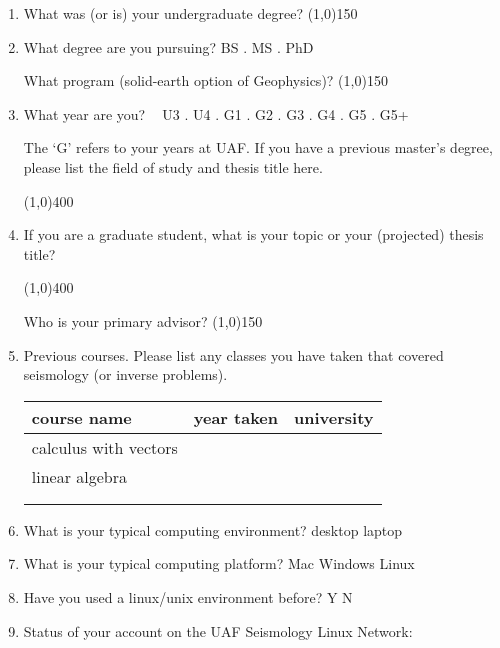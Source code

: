 \documentclass[11pt,titlepage,fleqn]{article}
\begin{document}
\begin{enumerate}
\item What was (or is) your undergraduate degree? \line(1,0){150}

\item What degree are you pursuing? BS . MS . PhD

\noindent
What program (\eg solid-earth option of Geophysics)? \line(1,0){150}

\item What year are you? $\;\;$ U3 . U4 . G1 . G2 . G3 . G4 . G5 . G5+

The `G' refers to your years at UAF. If you have a previous master's degree, please list the field of study and thesis title here.

\noindent \line(1,0){400}

\item If you are a graduate student, what is your topic or your (projected) thesis title?

\noindent \line(1,0){400}

\noindent Who is your primary advisor? \noindent \line(1,0){150}

\item Previous courses. Please list any classes you have taken that covered
seismology (or inverse problems).

\begin{tabular}{l|l|l}
\hline
course name & year taken & university \\ \hline\hline
calculus with vectors & & \hspace{3cm} \\ \hline
linear algebra & & \\ \hline
\hspace{8cm}  & & \\ \hline
 & & \\ \hline
\end{tabular}

\item What is your typical computing environment? desktop laptop

\item What is your typical computing platform? Mac Windows Linux

\item Have you used a linux/unix environment before? Y N

\item Status of your account on the UAF Seismology Linux Network:


\end{enumerate}
\end{document}
